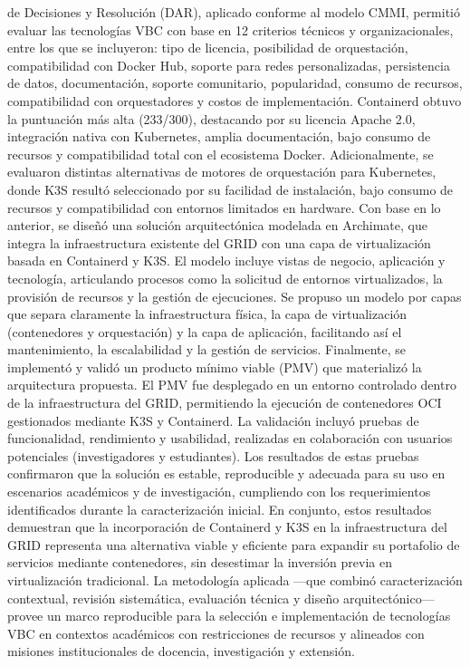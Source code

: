 de Decisiones y Resolución (DAR), aplicado conforme al modelo CMMI, permitió evaluar las tecnologías VBC con base en 12 criterios técnicos y organizacionales, entre los que se incluyeron: tipo de licencia, posibilidad de orquestación, compatibilidad con Docker Hub, soporte para redes personalizadas, persistencia de datos, documentación, soporte comunitario, popularidad, consumo de recursos, compatibilidad con orquestadores y costos de implementación. Containerd obtuvo la puntuación más alta (233/300), destacando por su licencia Apache 2.0, integración nativa con Kubernetes, amplia documentación, bajo consumo de recursos y compatibilidad total con el ecosistema Docker. Adicionalmente, se evaluaron distintas alternativas de motores de orquestación para Kubernetes, donde K3S resultó seleccionado por su facilidad de instalación, bajo consumo de recursos y compatibilidad con entornos limitados en hardware. Con base en lo anterior, se diseñó una solución arquitectónica modelada en Archimate, que integra la infraestructura existente del GRID con una capa de virtualización basada en Containerd y K3S. El modelo incluye vistas de negocio, aplicación y tecnología, articulando procesos como la solicitud de entornos virtualizados, la provisión de recursos y la gestión de ejecuciones. Se propuso un modelo por capas que separa claramente la infraestructura física, la capa de virtualización (contenedores y orquestación) y la capa de aplicación, facilitando así el mantenimiento, la escalabilidad y la gestión de servicios. Finalmente, se implementó y validó un producto mínimo viable (PMV) que materializó la arquitectura propuesta. El PMV fue desplegado en un entorno controlado dentro de la infraestructura del GRID, permitiendo la ejecución de contenedores OCI gestionados mediante K3S y Containerd. La validación incluyó pruebas de funcionalidad, rendimiento y usabilidad, realizadas en colaboración con usuarios potenciales (investigadores y estudiantes). Los resultados de estas pruebas confirmaron que la solución es estable, reproducible y adecuada para su uso en escenarios académicos y de investigación, cumpliendo con los requerimientos identificados durante la caracterización inicial. En conjunto, estos resultados demuestran que la incorporación de Containerd y K3S en la infraestructura del GRID representa una alternativa viable y eficiente para expandir su portafolio de servicios mediante contenedores, sin desestimar la inversión previa en virtualización tradicional. La metodología aplicada ---que combinó caracterización contextual, revisión sistemática, evaluación técnica y diseño arquitectónico--- provee un marco reproducible para la selección e implementación de tecnologías VBC en contextos académicos con restricciones de recursos y alineados con misiones institucionales de docencia, investigación y extensión.